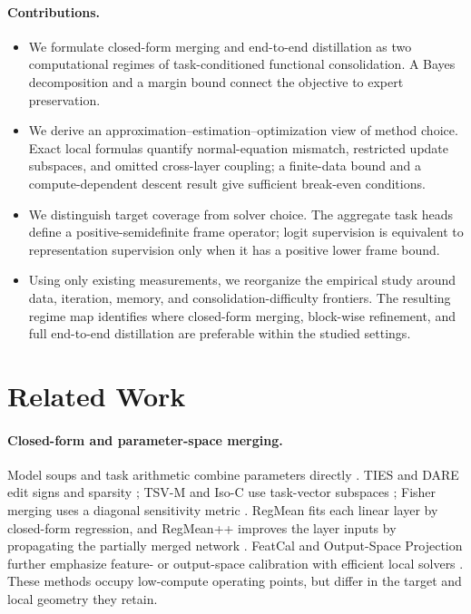 \documentclass[letterpaper]{article} %
\theoremstyle{plain}
\theoremstyle{definition}
\begin{document}
\paragraph{Contributions.}
\begin{itemize}
    \item We formulate closed-form merging and end-to-end distillation as two
    computational regimes of task-conditioned functional consolidation. A Bayes
    decomposition and a margin bound connect the objective to expert preservation.
    \item We derive an approximation--estimation--optimization view of method choice.
    Exact local formulas quantify normal-equation mismatch, restricted update subspaces,
    and omitted cross-layer coupling; a finite-data bound and a compute-dependent descent
    result give sufficient break-even conditions.
    \item We distinguish target coverage from solver choice. The aggregate task heads
    define a positive-semidefinite frame operator; logit supervision is equivalent to
    representation supervision only when it has a positive lower frame bound.
    \item Using only existing measurements, we reorganize the empirical study around
    data, iteration, memory, and consolidation-difficulty frontiers. The resulting regime
    map identifies where closed-form merging, block-wise refinement, and full end-to-end
    distillation are preferable within the studied settings.
\end{itemize}

\section{Related Work}
\label{sec:related}

\paragraph{Closed-form and parameter-space merging.}
Model soups and task arithmetic combine parameters directly
\citep{wortsman2022modelsoups,ilharco2023taskarithmetic}. TIES and DARE edit signs and
sparsity \citep{yadav2023ties,yu2024dare}; TSV-M and Iso-C use task-vector subspaces
\citep{gargiulo2025tsvm,marczak2025isotropic}; Fisher merging uses a diagonal sensitivity
metric \citep{matena2022fisher}. RegMean fits each linear layer by closed-form regression,
and RegMean++ improves the layer inputs by propagating the partially merged network
\citep{jin2023regmean,regmeanplusplus2025}. FeatCal and Output-Space Projection further
emphasize feature- or output-space calibration with efficient local solvers
\citep{featcal2026,outputprojection2026}. These methods occupy low-compute operating
points, but differ in the target and local geometry they retain.
\end{document}
